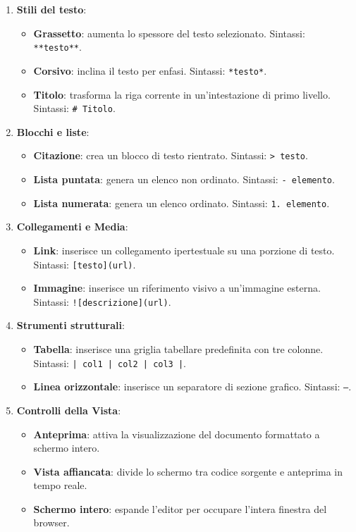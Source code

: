 \documentclass[11pt,a4paper]{article}
\begin{document}
\begin{enumerate}
    \item \textbf{Stili del testo}:
    \begin{itemize}
        \item \textbf{Grassetto}: aumenta lo spessore del testo selezionato. Sintassi: \texttt{**testo**}.
        \item \textbf{Corsivo}: inclina il testo per enfasi. Sintassi: \texttt{*testo*}.
        \item \textbf{Titolo}: trasforma la riga corrente in un'intestazione di primo livello. Sintassi: \texttt{\# Titolo}.
    \end{itemize}
    
    \item \textbf{Blocchi e liste}:
    \begin{itemize}
        \item \textbf{Citazione}: crea un blocco di testo rientrato. Sintassi: \texttt{> testo}.
        \item \textbf{Lista puntata}: genera un elenco non ordinato. Sintassi: \texttt{- elemento}.
        \item \textbf{Lista numerata}: genera un elenco ordinato. Sintassi: \texttt{1. elemento}.
    \end{itemize}
    
    \item \textbf{Collegamenti e Media}:
    \begin{itemize}
        \item \textbf{Link}: inserisce un collegamento ipertestuale su una porzione di testo. Sintassi: \texttt{[testo](url)}.
        \item \textbf{Immagine}: inserisce un riferimento visivo a un'immagine esterna. Sintassi: \texttt{![descrizione](url)}.
    \end{itemize}
    
    \item \textbf{Strumenti strutturali}:
    \begin{itemize}
        \item \textbf{Tabella}: inserisce una griglia tabellare predefinita con tre colonne. Sintassi: \texttt{| col1 | col2 | col3 |}.
        \item \textbf{Linea orizzontale}: inserisce un separatore di sezione grafico. Sintassi: \texttt{---}.
    \end{itemize}
    
    \item \textbf{Controlli della Vista}:
    \begin{itemize}
        \item \textbf{Anteprima}: attiva la visualizzazione del documento formattato a schermo intero.
        \item \textbf{Vista affiancata}: divide lo schermo tra codice sorgente e anteprima in tempo reale.
        \item \textbf{Schermo intero}: espande l'editor per occupare l'intera finestra del browser.
    \end{itemize}
    

\end{enumerate}
\end{document}
